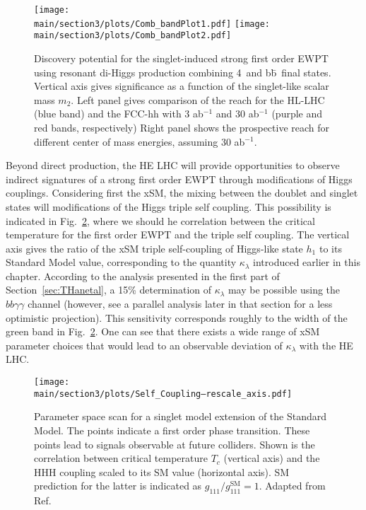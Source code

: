 \begin{figure}[hbtp]
  \begin{center}
    \texttt{[image: \\main/section3/plots/Comb\_bandPlot1.pdf]}
    \texttt{[image: \\main/section3/plots/Comb\_bandPlot2.pdf]}
    \caption{
    Discovery potential for the singlet-induced strong first order EWPT using resonant di-Higgs production combining 4\texttau\ and b\={b}\textgamma\textgamma\ final states\cite{Kotwal:2016tex}. Vertical axis gives significance as a function of the singlet-like scalar mass $m_2$. Left panel gives comparison of the reach for the HL-LHC (blue band) and the FCC-hh with 3 ab$^{-1}$ and 30 ab$^{-1}$ (purple and red bands, respectively) Right panel shows the prospective reach for different center of mass energies, assuming 30 ab$^{-1}$.    
        }
    \label{fig:ewpt_resdihiggs}
  \end{center}
\end{figure}

Beyond direct production, the HE LHC will provide opportunities to observe indirect signatures of a strong first order EWPT through modifications of Higgs couplings. Considering first the xSM, the mixing between the doublet and singlet states will modifications of the Higgs triple self coupling. This possibility is indicated in Fig.~\ref{fig:ewpt_self}, where we should he correlation between the critical temperature for the first order EWPT and the triple self coupling. The vertical axis gives the ratio of the xSM triple self-coupling of Higgs-like state $h_1$ to its Standard Model value, corresponding to the quantity $\kappa_\lambda$  introduced earlier in this chapter.  According to the analysis presented in the first part of Section~\ref{sec:THanetal}, a 15\% determination of $\kappa_\lambda$ may be possible using the $bb\gamma\gamma$ channel (however, see a parallel analysis later in that section for a less optimistic projection). This sensitivity corresponds roughly to the width of the green band in Fig.~\ref{fig:ewpt_self}. One can see that there exists a wide range of xSM parameter choices that would lead to an observable deviation of $\kappa_\lambda$ with the HE LHC.

\begin{figure}[hbtp]
  \begin{center}
    \texttt{[image: \\main/section3/plots/Self\_Coupling--rescale\_axis.pdf]}
    \caption{
    Parameter space scan for a singlet model extension of the Standard Model. The points indicate a first order phase transition. These points lead to signals observable at future colliders. Shown is the correlation between critical temperature $T_c$ (vertical axis) and the HHH coupling scaled to its SM value (horizontal axis). SM prediction for the latter is indicated as $g_{111}/g_{111}^\mathrm{SM}=1$. Adapted from Ref.~\cite{Profumo:2014opa}   
        }
    \label{fig:ewpt_self}
  \end{center}
\end{figure}

